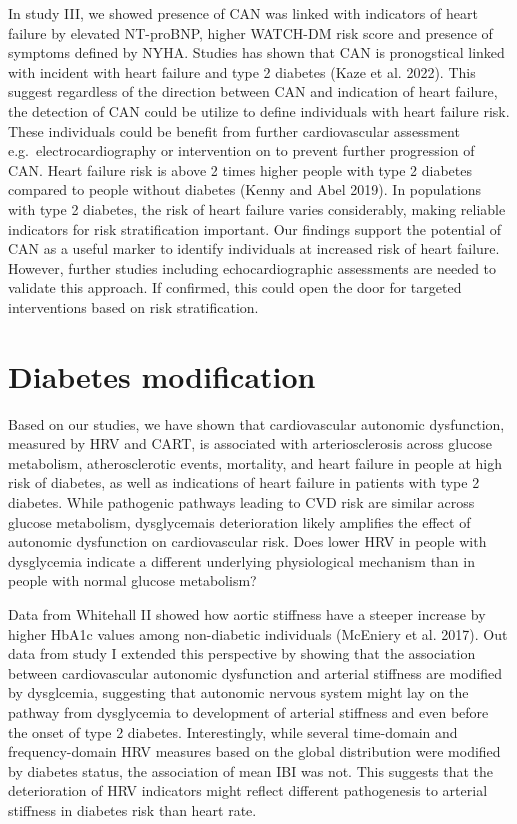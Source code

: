 \documentclass[
  a4paper,
  headsepline=true,
  open=any]{scrbook}
\begin{document}
In study III, we showed presence of CAN was linked with indicators of
heart failure by elevated NT-proBNP, higher WATCH-DM risk score and
presence of symptoms defined by NYHA. Studies has shown that CAN is
pronogstical linked with incident with heart failure and type 2 diabetes
(Kaze et al. 2022). This suggest regardless of the direction between CAN
and indication of heart failure, the detection of CAN could be utilize
to define individuals with heart failure risk. These individuals could
be benefit from further cardiovascular assessment
e.g.~electrocardiography or intervention on to prevent further
progression of CAN. Heart failure risk is above 2 times higher people
with type 2 diabetes compared to people without diabetes (Kenny and Abel
2019). In populations with type 2 diabetes, the risk of heart failure
varies considerably, making reliable indicators for risk stratification
important. Our findings support the potential of CAN as a useful marker
to identify individuals at increased risk of heart failure. However,
further studies including echocardiographic assessments are needed to
validate this approach. If confirmed, this could open the door for
targeted interventions based on risk stratification.

\hypertarget{diabetes-modification}{%
\section{Diabetes modification}\label{diabetes-modification}}

Based on our studies, we have shown that cardiovascular autonomic
dysfunction, measured by HRV and CART, is associated with
arteriosclerosis across glucose metabolism, atherosclerotic events,
mortality, and heart failure in people at high risk of diabetes, as well
as indications of heart failure in patients with type 2 diabetes. While
pathogenic pathways leading to CVD risk are similar across glucose
metabolism, dysglycemais deterioration likely amplifies the effect of
autonomic dysfunction on cardiovascular risk. Does lower HRV in people
with dysglycemia indicate a different underlying physiological mechanism
than in people with normal glucose metabolism?

Data from Whitehall II showed how aortic stiffness have a steeper
increase by higher HbA1c values among non-diabetic individuals (McEniery
et al. 2017). Out data from study I extended this perspective by showing
that the association between cardiovascular autonomic dysfunction and
arterial stiffness are modified by dysglcemia, suggesting that autonomic
nervous system might lay on the pathway from dysglycemia to development
of arterial stiffness and even before the onset of type 2 diabetes.
Interestingly, while several time-domain and frequency-domain HRV
measures based on the global distribution were modified by diabetes
status, the association of mean IBI was not. This suggests that the
deterioration of HRV indicators might reflect different pathogenesis to
arterial stiffness in diabetes risk than heart rate.
\end{document}
